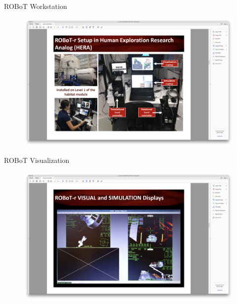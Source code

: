 \documentclass[10pt]{beamer}
\begin{document}
\begin{frame}[fragile]{ROBoT Workstation}
\begin{figure}
  \begin{center}
    \includegraphics[trim={13cm 5cm 22cm 15.5cm},clip,width=\linewidth]{../img/Screen_Shot_2018-07-26_at_1.43.16_PM.png}
  \end{center}
\end{figure}
\end{frame}

\begin{frame}[fragile]{ROBoT Visualization}
\begin{figure}
  \begin{center}
    \includegraphics[trim={13cm 5cm 22cm 15.5cm},clip,width=\linewidth]{../img/Screen_Shot_2018-07-26_at_1.43.02_PM.png}
  \end{center}
\end{figure}
\end{frame}
\end{document}
